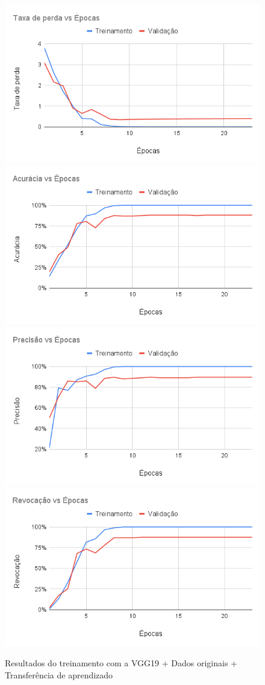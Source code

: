 \documentclass[
	12pt,				%
	oneside,			%
	a4paper,			%
	english,			%
	brazil				%
	]{abntex2ppgsi}
\begin{document}
\begin{figure}[H]
    \centering
    \caption{Resultados do treinamento com a VGG19 + Dados originais + Transferência de aprendizado}
    \includegraphics[width=.50\textwidth]{imagens/resultados_discussao/architecture/vgg_19/transfer_learning/original/perda.png}\hfill
    \includegraphics[width=.50\textwidth]{imagens/resultados_discussao/architecture/vgg_19/transfer_learning/original/acuracia.png}\bigbreak    \includegraphics[width=.50\textwidth]{imagens/resultados_discussao/architecture/vgg_19/transfer_learning/original/precisao.png}\hfill
    \includegraphics[width=.50\textwidth]{imagens/resultados_discussao/architecture/vgg_19/transfer_learning/original/revocacao.png}
    \label{fig:vgg_19_original_transferencia_aprendizado}
\end{figure}
\end{document}
